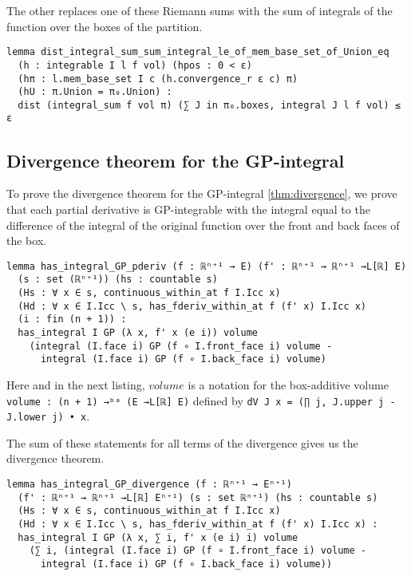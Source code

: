\documentclass[a4paper, UKenglish,cleveref, autoref, thm-restate]{lipics-v2021}
\begin{document}
The other replaces one of these Riemann sums with the sum of integrals
of the function over the boxes of the partition.

\begin{lstlisting}
lemma dist_integral_sum_sum_integral_le_of_mem_base_set_of_Union_eq
  (h : integrable I l f vol) (hpos : 0 < ε)
  (hπ : l.mem_base_set I c (h.convergence_r ε c) π)
  (hU : π.Union = π₀.Union) :
  dist (integral_sum f vol π) (∑ J in π₀.boxes, integral J l f vol) ≤ ε
\end{lstlisting}

\subsection{Divergence theorem for the GP-integral}%
\label{sec:diverg-theor-gp}

To prove the divergence theorem for the GP-integral
\autoref{thm:divergence}, we prove that each partial derivative is
GP-integrable with the integral equal to the difference of the
integral of the original function over the front and back faces of the
box.

\begin{lstlisting}
lemma has_integral_GP_pderiv (f : ℝⁿ⁺¹ → E) (f' : ℝⁿ⁺¹ → ℝⁿ⁺¹ →L[ℝ] E)
  (s : set (ℝⁿ⁺¹)) (hs : countable s)
  (Hs : ∀ x ∈ s, continuous_within_at f I.Icc x)
  (Hd : ∀ x ∈ I.Icc \ s, has_fderiv_within_at f (f' x) I.Icc x)
  (i : fin (n + 1)) :
  has_integral I GP (λ x, f' x (e i)) volume
    (integral (I.face i) GP (f ∘ I.front_face i) volume -
      integral (I.face i) GP (f ∘ I.back_face i) volume)
\end{lstlisting}

Here and in the next listing, \(volume\) is a notation for the
box-additive volume \lstinline=volume : (n + 1) →ᵇᵃ (E →L[ℝ] E)=
defined by \lstinline+dV J x = (∏ j, J.upper j - J.lower j) • x+.

The sum of these statements for all terms of the divergence gives us
the divergence theorem.

\begin{lstlisting}[caption={The divergence theorem for the GP-integral},label=lst:divergence-GP]
lemma has_integral_GP_divergence (f : ℝⁿ⁺¹ → Eⁿ⁺¹)
  (f' : ℝⁿ⁺¹ → ℝⁿ⁺¹ →L[ℝ] Eⁿ⁺¹) (s : set ℝⁿ⁺¹) (hs : countable s)
  (Hs : ∀ x ∈ s, continuous_within_at f I.Icc x)
  (Hd : ∀ x ∈ I.Icc \ s, has_fderiv_within_at f (f' x) I.Icc x) :
  has_integral I GP (λ x, ∑ i, f' x (e i) i) volume
    (∑ i, (integral (I.face i) GP (f ∘ I.front_face i) volume -
      integral (I.face i) GP (f ∘ I.back_face i) volume))
\end{lstlisting}
\end{document}
